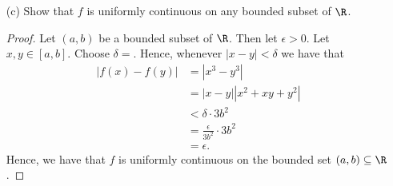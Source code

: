 \begin{enumerate}
\begin{proof}
        \end{proof}
    \item[(c)] Show that \( f \) is uniformly continuous on any bounded subset of \( \R  \). 
        \begin{proof}
            Let \( (a,b) \) be a bounded subset of \( \R  \). Then let \( \epsilon > 0 \). Let \( x,y \in [a,b] \). Choose \( \delta =  \). Hence, whenever \( | x - y  | < \delta  \) we have that 
            \begin{align*}
                | f(x) - f(y) | &= | x^3 - y^3  |  \\
                                &= | x - y  | | x^2 + xy + y^2  | \\
                                &< \delta \cdot 3b^2 \\ 
                                &= \frac{ \epsilon  }{ 3b^2 }  \cdot 3b^2 \\
                                &= \epsilon.
            \end{align*}
            Hence, we have that \( f \) is uniformly continuous on the bounded set \( (a,b) \subseteq \R  \).
        \end{proof}
\end{enumerate}

